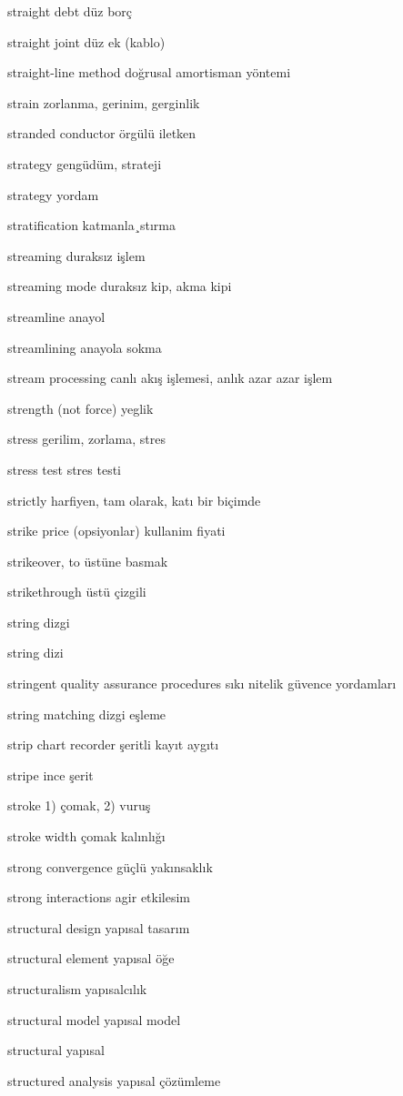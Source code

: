 \documentclass[12pt,fleqn]{article}\usepackage{../../common}
\begin{document}
straight debt düz borç

straight joint düz ek (kablo)

straight-line method doğrusal amortisman yöntemi

strain zorlanma, gerinim, gerginlik

stranded conductor örgülü iletken

strategy gengüdüm, strateji

strategy yordam

stratification katmanla¸stırma

streaming duraksız işlem

streaming mode duraksız kip, akma kipi

streamline anayol

streamlining anayola sokma

stream processing canlı akış işlemesi, anlık azar azar işlem

strength (not force) yeglik

stress gerilim, zorlama, stres

stress test stres testi

strictly harfiyen, tam olarak, katı bir biçimde

strike price (opsiyonlar) kullanim fiyati

strikeover, to üstüne basmak

strikethrough üstü çizgili

string dizgi

string dizi

stringent quality assurance procedures sıkı nitelik güvence yordamları

string matching dizgi eşleme

strip chart recorder şeritli kayıt aygıtı

stripe ince şerit

stroke 1) çomak, 2) vuruş

stroke width çomak kalınlığı

strong convergence güçlü yakınsaklık

strong interactions agir etkilesim

structural design yapısal tasarım

structural element yapısal öğe

structuralism yapısalcılık

structural model yapısal model

structural yapısal

structured analysis yapısal çözümleme
\end{document}
